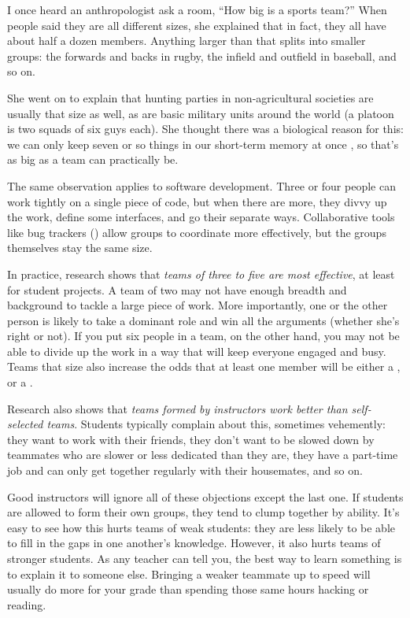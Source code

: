 \documentclass{report}
\begin{document}

I once heard an anthropologist ask a room, ``How big is a sports
team?''  When people said they are all different sizes, she explained
that in fact, they all have about half a dozen members.  Anything
larger than that splits into smaller groups: the forwards and backs in
rugby, the infield and outfield in baseball, and so on.

She went on to explain that hunting parties in non-agricultural
societies are usually that size as well, as are basic military units
around the world (a platoon is two squads of six guys each).  She
thought there was a biological reason for this: we can only keep seven
or so things in our short-term memory at once
\cite{b:hock-forty-studies}, so that's as big as a team can
practically be.

The same observation applies to software development.  Three or four
people can work tightly on a single piece of code, but when there are
more, they divvy up the work, define some interfaces, and go their
separate ways.  Collaborative tools like bug trackers
() allow groups to coordinate more effectively, but
the groups themselves stay the same size.

In practice, research shows that \emph{teams of three to five are most
effective}, at least for student projects.  A team of two may not have enough breadth and background to
tackle a large piece of work.  More importantly, one or the other
person is likely to take a dominant role and win all the arguments
(whether she's right or not).  If you put six people in a team, on the
other hand, you may not be able to divide up the work in a way that
will keep everyone engaged and busy.  Teams that size also increase
the odds that at least one member will be either a
, or a .

Research also shows that \emph{teams formed by instructors work better
than self-selected teams}.  Students typically complain about this,
sometimes vehemently: they want to work with their friends, they don't
want to be slowed down by teammates who are slower or less dedicated
than they are, they have a part-time job and can only get together
regularly with their housemates, and so on.

Good instructors will ignore all of these objections except the last
one. If students are allowed to form their own groups, they tend to
clump together by ability.  It's easy to see how this hurts teams of
weak students: they are less likely to be able to fill in the gaps in
one another's knowledge.  However, it also hurts teams of stronger
students.  As any teacher can tell you, the best way to learn
something is to explain it to someone else.  Bringing a weaker
teammate up to speed will usually do more for your grade than spending
those same hours hacking or reading.
\end{document}
